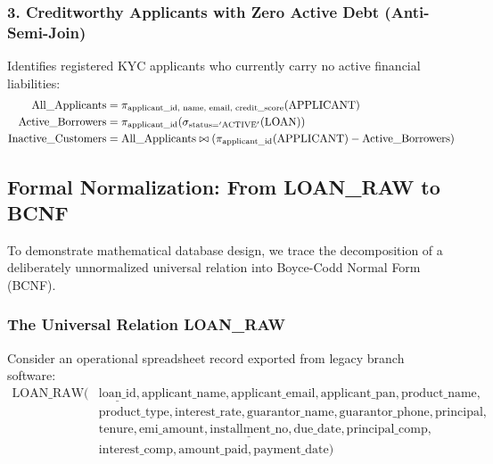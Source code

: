 \documentclass[11pt,a4paper]{report}
\begin{document}
\subsubsection{3. Creditworthy Applicants with Zero Active Debt (Anti-Semi-Join)}
Identifies registered KYC applicants who currently carry no active financial liabilities:
\begin{align}
    \text{All\_Applicants} &= \pi_{\text{applicant\_id, name, email, credit\_score}}(\text{APPLICANT}) \notag \\
    \text{Active\_Borrowers} &= \pi_{\text{applicant\_id}}(\sigma_{\text{status} = '\text{ACTIVE}'}(\text{LOAN})) \notag \\
    \text{Inactive\_Customers} &= \text{All\_Applicants} \bowtie \left( \pi_{\text{applicant\_id}}(\text{APPLICANT}) - \text{Active\_Borrowers} \right)
\end{align}

\subsection{Formal Normalization: From LOAN\_RAW to BCNF}
To demonstrate mathematical database design, we trace the decomposition of a deliberately unnormalized universal relation into Boyce-Codd Normal Form (BCNF).

\subsubsection{The Universal Relation LOAN\_RAW}
Consider an operational spreadsheet record exported from legacy branch software:
\begin{align*}
\text{LOAN\_RAW}(&\underline{\text{loan\_id}}, \text{applicant\_name}, \text{applicant\_email}, \text{applicant\_pan}, \text{product\_name}, \\
&\text{product\_type}, \text{interest\_rate}, \text{guarantor\_name}, \text{guarantor\_phone}, \text{principal}, \\
&\text{tenure}, \text{emi\_amount}, \underline{\text{installment\_no}}, \text{due\_date}, \text{principal\_comp}, \\
&\text{interest\_comp}, \text{amount\_paid}, \text{payment\_date})
\end{align*}
\end{document}
